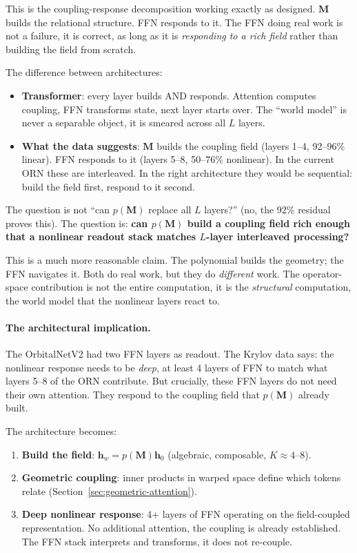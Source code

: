 \documentclass[11pt, a4paper]{article}
\newcommand{\M}{\mathbf{M}}
\newcommand{\h}{\mathbf{h}}
\theoremstyle{plain}
\theoremstyle{definition}
\theoremstyle{remark}
\begin{document}
This is the coupling-response decomposition working exactly as designed.
$\M$ builds the relational structure.
FFN responds to it.
The FFN doing real work is not a failure, it is correct, as long as it is \emph{responding to a rich field} rather than building the field from scratch.

The difference between architectures:
\begin{itemize}[nosep]
\item \textbf{Transformer}: every layer builds AND responds. Attention computes coupling, FFN transforms state, next layer starts over. The ``world model'' is never a separable object, it is smeared across all $L$ layers.
\item \textbf{What the data suggests}: $\M$ builds the coupling field (layers 1--4, 92--96\% linear). FFN responds to it (layers 5--8, 50--76\% nonlinear). In the current ORN these are interleaved. In the right architecture they would be sequential: build the field first, respond to it second.
\end{itemize}

The question is not ``can $p(\M)$ replace all $L$ layers?'' (no, the 92\% residual proves this).
The question is: \textbf{can $p(\M)$ build a coupling field rich enough that a nonlinear readout stack matches $L$-layer interleaved processing?}

This is a much more reasonable claim.
The polynomial builds the geometry; the FFN navigates it.
Both do real work, but they do \emph{different} work.
The operator-space contribution is not the entire computation, it is the \emph{structural} computation, the world model that the nonlinear layers react to.

\paragraph{The architectural implication.}
The OrbitalNetV2 had two FFN layers as readout.
The Krylov data says: the nonlinear response needs to be \emph{deep}, at least 4 layers of FFN to match what layers 5--8 of the ORN contribute.
But crucially, these FFN layers do not need their own attention.
They respond to the coupling field that $p(\M)$ already built.

The architecture becomes:
\begin{enumerate}[nosep]
\item \textbf{Build the field}: $\h_w = p(\M) \h_0$ (algebraic, composable, $K \approx 4$--$8$).
\item \textbf{Geometric coupling}: inner products in warped space define which tokens relate (Section~\ref{sec:geometric-attention}).
\item \textbf{Deep nonlinear response}: 4+ layers of FFN operating on the field-coupled representation. No additional attention, the coupling is already established. The FFN stack interprets and transforms, it does not re-couple.
\end{enumerate}
\end{document}
